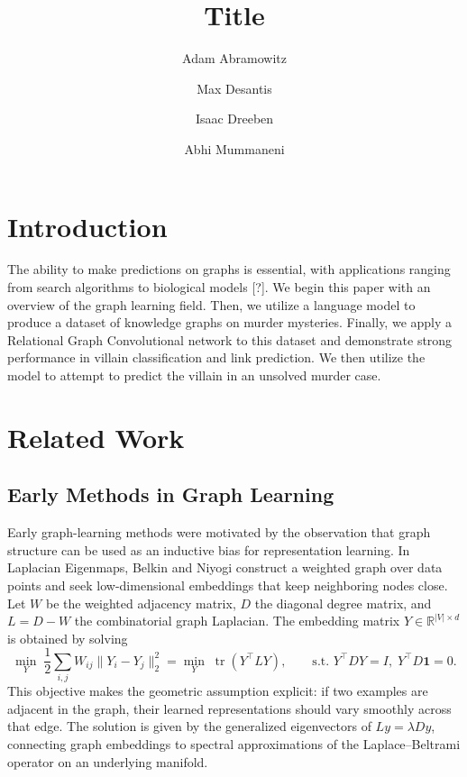 \documentclass[11pt]{article}
\title{Title}
\author{Adam Abramowitz \and Max Desantis \and Isaac Dreeben \and Abhi Mummaneni}
\date{}
\begin{document}
\maketitle

\begin{abstract}
\end{abstract}

\section{Introduction}

    The ability to make predictions on graphs is essential, with applications ranging from search algorithms to biological models [?]. We begin this paper with an overview of the graph learning field. Then, we utilize a language model to produce a dataset of knowledge graphs on murder mysteries. Finally, we apply a Relational Graph Convolutional network to this dataset and demonstrate strong performance in villain classification and link prediction. We then utilize the model to attempt to predict the villain in an unsolved murder case. 

\section{Related Work}


\subsection{Early Methods in Graph Learning}
Early graph-learning methods were motivated by the observation that graph structure can be used as an inductive bias for representation learning. In Laplacian Eigenmaps, Belkin and Niyogi \cite{belkin2001laplacian} construct a weighted graph over data points and seek low-dimensional embeddings that keep neighboring nodes close. Let $W$ be the weighted adjacency matrix, $D$ the diagonal degree matrix, and $L = D - W$ the combinatorial graph Laplacian. The embedding matrix $Y \in \mathbb{R}^{|V| \times d}$ is obtained by solving
\[
    \min_Y \; \frac{1}{2}\sum_{i,j} W_{ij}\|Y_i - Y_j\|_2^2
    = \min_Y \; \operatorname{tr}(Y^\top L Y),
    \qquad
    \text{s.t. } Y^\top D Y = I, \; Y^\top D\mathbf{1}=0.
\]
This objective makes the geometric assumption explicit: if two examples are adjacent in the graph, their learned representations should vary smoothly across that edge. The solution is given by the generalized eigenvectors of $L y = \lambda D y$, connecting graph embeddings to spectral approximations of the Laplace--Beltrami operator on an underlying manifold.
\end{document}
